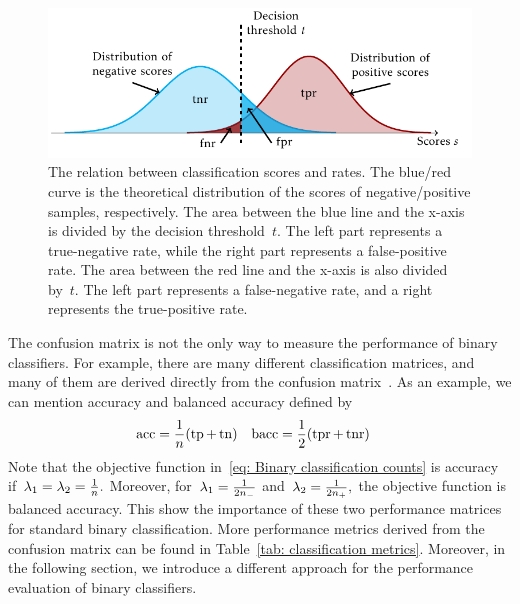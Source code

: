 \begin{figure}
  \centering
  \includegraphics{images/confusion_rates.pdf}
  \caption{The relation between classification scores and  rates. The blue/red curve is the theoretical distribution of the scores of negative/positive samples, respectively. The area between the blue line and the x-axis is divided by the decision threshold~$t.$ The left part represents a true-negative rate, while the right part represents a false-positive rate. The area between the red line and the x-axis is also divided by~$t.$ The left part represents a false-negative rate, and a right represents the true-positive rate.}
  \label{fig: scores and rates}
\end{figure}

The confusion matrix is not the only way to measure the performance of binary classifiers. For example, there are many different classification matrices, and many of them are derived directly from the confusion matrix~\cite{fawcett2006introduction, metz1978basic, brodersen2010balanced, hossin2015review}. As an example, we can mention accuracy and balanced accuracy defined by
\begin{align*}
  \accuracy & = \frac{1}{n}\Brac{\tp + \tn} &
  \baccuracy & = \frac{1}{2}\Brac{\tpr + \tnr}
\end{align*}
Note that the objective function in~\eqref{eq: Binary classification counts} is accuracy if~$\lambda_1 = \lambda_2 = \frac{1}{n}.$ Moreover, for~$\lambda_1 = \frac{1}{2n_{-}}$ and~$\lambda_2 = \frac{1}{2n_{+}},$ the objective function is balanced accuracy. This show the importance of these two performance matrices for standard binary classification. More performance metrics derived from the confusion matrix can be found in Table~\ref{tab: classification metrics}. Moreover, in the following section, we introduce a different approach for the performance evaluation of binary classifiers.

